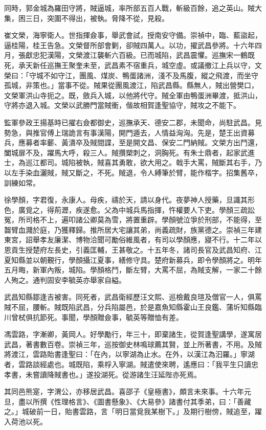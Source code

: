 \begin{pinyinscope}
同時，郭金城為羅田守將，賊逼城，率所部五百人戰，斬級百餘，追之英山。賊大集，困三日，突圍不得出，被執。脅降不從，見殺。

崔文榮，海寧衛人。世指揮僉事，舉武會試，授南安守備。崇禎中，臨、藍盜起，逼桂陽，桂王告急。文榮督所部會剿，卻賊四萬人。以功，擢武昌參將。十六年四月，張獻忠犯漢陽，文榮渡江襲斬六百級。已而城陷，武昌震懼。巡撫宋一鶴既死，承天新任巡撫王聚奎未至，武昌素不宿重兵，城空虛。或議撤江上兵以守，文榮曰：「守城不如守江，團風、煤炭、鴨蛋諸洲，淺不及馬腹，縱之飛渡，而坐守孤城，非策也。」當事不從。賊果從團風渡江，陷武昌縣。縣無人，賊出營樊口，文榮軍洪山寺扼之。既，斂兵入城，以他將代守。賊全軍由鴨蛋洲畢渡，抵洪山，守將亦退入城。文榮以武勝門當賊衝，偕故相賀逢聖協守，賊攻之不能下。

監軍參政王揚基時已擢右僉都御史，巡撫承天、德安二郡，未聞命，尚駐武昌。見勢急，與推官傅上瑞詭言有事漢陽，開門遁去，人情益洶洶。先是，楚王出資募兵，應募者率蘄、黃潰卒及賊間諜，至是開文昌、保安二門納賊。文榮方出鬥還，闔城扉不及，躍馬大呼，殺三人。賊攢槊刺之，洞胸死。有朱士鼎者，起家武進士，為巡江都司。城陷被執，賊喜其勇敢，欲大用之。戟手大罵，賊斷其右手，乃以左手染血灑賊，賊又斷之，不死。賊退，令人縛筆於臂，能作楷字。招集舊卒，訓練如常。

徐學顏，字君復，永康人。母疾，禱於天，請以身代。夜夢神人授藥，旦識其形色，廣覓之，得荊瀝，疾遂愈。父為中城兵馬指揮，忤權要人下吏。學顏三疏訟冤，所司格不上，遍叩諸公卿莫為雪，將置重辟。學顏號泣爭於刑部，不能得，至齧臂血濺於庭，乃獲釋歸。推所居大宅讓其弟，尚義疏財，族黨德之。崇禎三年建東宮，詔舉孝友廉潔、博物洽聞可勵俗維風者，有司以學顏應，寢不行。十二年以恩貢生授楚府左長史，引義匡輔，王甚敬之。十五年冬，諸司長官及武昌知府、江夏知縣並以朝覲行，學顏攝江夏事，繕修守具。楚府新募兵，即令學顏將之。明年五月晦，新軍內叛，城陷。學顏格鬥，斷左臂，大罵不屈，為賊支解，一家二十餘人殉之。通判固安李毓英亦舉家自縊。

武昌知縣鄒逢吉被害。同死者，武昌衛經歷汪文熙、巡檢戴良瑄及僧官一人，俱罵賊不屈，腰斬。賊既陷武昌，分兵陷屬邑，於是嘉魚知縣霍山王良鑑、蒲圻知縣臨川曾栻俱抗節死。事聞，學顏贈僉事，毓英等贈恤有差。

馮雲路，字漸卿，黃岡人。好學勵行，年三十，即棄諸生，從賀逢聖講學，遂寓居武昌，著書數百卷。崇禎三年，巡按御史林鳴球薦其賢，並上所著書，不用。及賊將渡江，雲路貽書逢聖曰：「在內，以寧湖為止水。在外，以漢江為汩羅。」寧湖者，雲路談經處也。城既陷，乘桴入寧湖。賊遣使來聘，遙應曰：「我平生只讀忠孝書，未嘗讀降賊書也。」遂投湖死。從游諸生汪延陛亦死焉。

其同邑熊寔，字渭公，亦移居武昌。喜邵子《皇極書》，頗言未來事。十六年元旦，盡以所撰《性理格言》、《圖書懸象》、《大易參》諸書付其季弟，曰：「善藏之。」城破前一日，貽書雲路，言「明日當覓我某樹下。」及期行樹傍，賊追至，躍入荷池以死。


\end{pinyinscope}
